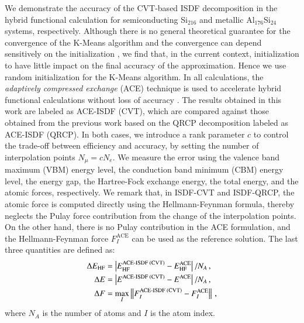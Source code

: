 We demonstrate the accuracy of the CVT\hyp{}based ISDF decomposition in the
hybrid functional calculation for semiconducting Si$_{216}$ and metallic Al$_
{176}$Si$_{24}$ systems, respectively. Although there is no general theoretical
guarantee for the convergence of the K-Means algorithm and the convergence can
depend sensitively on the initialization \cite{arthur2006slow,arthur2007k}, we
find that, in the current context, initialization to have little impact on the
final accuracy of the approximation. Hence we use random initialization for the
K\hyp{}Means algorithm. In all calculations, the \emph{adaptively compressed
exchange} (ACE) technique is used to accelerate hybrid functional calculations
without loss of accuracy \cite{JCTC_12_2242_2016_ACE}. The results obtained in
this work are labeled as ACE\hyp{}ISDF (CVT), which are compared against those
obtained from the previous work based on the QRCP decomposition 
\cite{JCTC_2017_ISDF} labeled as ACE\hyp{}ISDF (QRCP). In both cases, we
introduce a rank parameter $c$ to control the trade\hyp{}off between efficiency
and accuracy, by setting the number of interpolation points $N_\mu = cN_e$. We
measure the error using the valence band maximum (VBM) energy level, the
conduction band minimum (CBM) energy level, the energy gap, the 
Hartree\hyp{}Fock exchange energy, the total energy, and the atomic forces,
respectively. We remark that, in ISDF\hyp{}CVT and ISDF\hyp{}QRCP, the atomic
force is computed directly using the Hellmann\hyp{}Feynman formula, thereby
neglects the Pulay force contribution from the change of the interpolation
points. On the other hand, there is no Pulay contribution in the ACE
formulation, and the Hellmann\hyp{}Feynman force $F_I^\text{ACE}$ can be used as
the reference solution. The last three quantities are defined as:
\begin{align*}
	\Delta{E_\text{HF}} &= \left\lvert E_\text{HF}^\text{ACE-ISDF (CVT)} - E_\text{HF}^
	\text{ACE}\right\rvert/N_{A}\,,\\
	\Delta{E} &= \left\lvert E^\text{ACE-ISDF (CVT)} - E^\text{ACE}\right\rvert/N_{A}\,,\\
	{\Delta}F &= \max_I\left\lVert F_I^\text{ACE-ISDF (CVT)} - F_I^\text{ACE}\right\rVert\,,
\end{align*}
where $N_A$ is the number of atoms and $I$ is the atom index.

